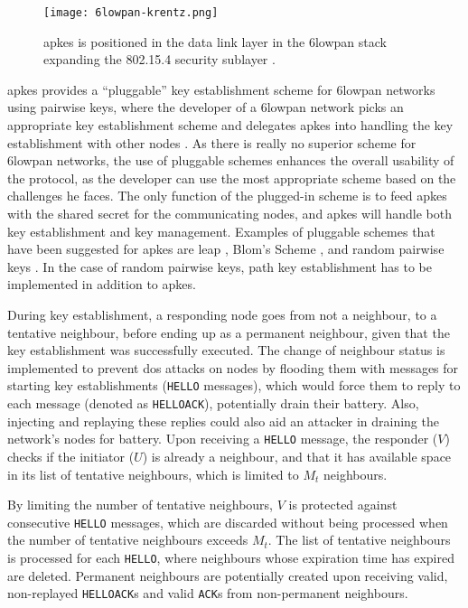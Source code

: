 \begin{figure}
	\centering
	\texttt{[image: 6lowpan-krentz.png]}
	\caption{\gls{apkes} is positioned in the data link layer in the \gls{6lowpan} stack expanding the 802.15.4 security sublayer \cite{krentz20136lowpan}.}
	\label{fig:6lowpan-krentz}
\end{figure}

\gls{apkes} provides a ``pluggable'' key establishment scheme for \gls{6lowpan} networks using pairwise keys, where the developer of a \gls{6lowpan} network picks an appropriate key establishment scheme and delegates \gls{apkes} into handling the key establishment with other nodes \cite{krentz20136lowpan}. As there is really no superior scheme for \gls{6lowpan} networks, the use of pluggable schemes enhances the overall usability of the protocol, as the developer can use the most appropriate scheme based on the challenges he faces. The only function of the plugged-in scheme is to feed \gls{apkes} with the shared secret for the communicating nodes, and \gls{apkes} will handle both key establishment and key management. Examples of pluggable schemes that have been suggested for \gls{apkes} are \gls{leap} \cite{zhu2006leap+}, Blom's Scheme \cite{blom1984optimal}, and random pairwise keys \cite{chan2003random}. In the case of random pairwise keys, path key establishment has to be implemented in addition to \gls{apkes}.




During key establishment, a responding node goes from not a neighbour, to a tentative neighbour, before ending up as a permanent neighbour, given that the key establishment was successfully executed. The change of neighbour status is implemented to prevent \gls{dos} attacks on nodes by flooding them with messages for starting key establishments (\texttt{HELLO} messages), which would force them to reply to each message (denoted as \texttt{HELLOACK}), potentially drain their battery. Also, injecting and replaying these replies could also aid an attacker in draining the network's nodes for battery. Upon receiving a \texttt{HELLO} message, the responder ($V$) checks if the initiator ($U$) is already a neighbour, and that it has available space in its list of tentative neighbours, which is limited to $M_t$ neighbours. 

By limiting the number of tentative neighbours, $V$ is protected against consecutive \texttt{HELLO} messages, which are discarded without being processed when the number of tentative neighbours exceeds $M_t$. The list of tentative neighbours is processed for each \texttt{HELLO}, where neighbours whose expiration time has expired are deleted. Permanent neighbours are potentially created upon receiving valid, non-replayed \texttt{HELLOACK}s and valid \texttt{ACK}s from non-permanent neighbours. 


